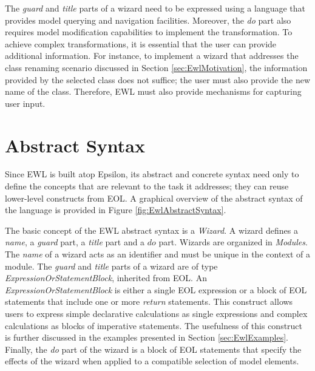 The \emph{guard} and \emph{title} parts of a wizard need to be expressed using a language that provides model querying and navigation facilities. Moreover, the \emph{do} part also requires model modification capabilities to implement the transformation. To achieve complex transformations, it is essential that the user can provide additional information. For instance, to implement a wizard that addresses the class renaming scenario discussed in Section \ref{sec:EwlMotivation}, the information provided by the selected class does not suffice; the user must also provide the new name of the class. Therefore, EWL must also provide mechanisms for capturing user input.

\section{Abstract Syntax}

Since EWL is built atop Epsilon, its abstract and concrete syntax need only to define the concepts that are relevant to the task it addresses; they can reuse lower-level constructs from EOL. A graphical overview of the abstract syntax of the language is provided in Figure \ref{fig:EwlAbstractSyntax}. 

The basic concept of the EWL abstract syntax is a \emph{Wizard}. A wizard defines a \emph{name}, a \emph{guard} part, a \emph{title} part and a $do$ part. Wizards are organized in \emph{Modules}. The \emph{name} of a wizard acts as an identifier and must be unique in the context of a module. The \emph{guard} and \emph{title} parts of a wizard are of type \emph{ExpressionOrStatementBlock}, inherited from EOL. An \emph{ExpressionOrStatementBlock} is either a single EOL expression or a block of EOL statements that include one or more \emph{return} statements. This construct allows users to express simple declarative calculations as single expressions and complex calculations as blocks of imperative statements. The usefulness of this construct is further discussed in the examples presented in Section \ref{sec:EwlExamples}. Finally, the \emph{do} part of the wizard is a block of EOL statements that specify the effects of the wizard when applied to a compatible selection of model elements. 

